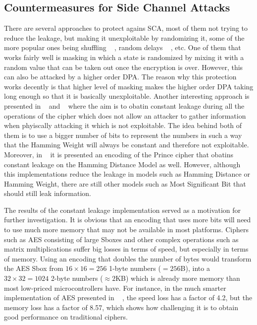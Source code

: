 \documentclass[conference]{IEEEtran}
\begin{document}
\subsection{Countermeasures for Side Channel Attacks}

There are several approaches to protect agains SCA, most of them not trying to reduce the leakage, but making it unexploitable by randomizing it, some of the more popular ones being shuffling ~\cite{WangShuffling} , random delays ~\cite{CoronRandomDelays} , etc. One of them that works fairly well is masking in which a state is randomized by mixing it with a random value that can be taken out once the encryption is over. However, this can also be attacked by a higher order DPA. The reason why this protection works decently is that higher level of masking makes the higher order DPA taking long enough so that it is basically unexploitable. Another interesting approach is presented in ~\cite{BEPrince} and ~\cite{ServantAES} where the aim is to obatin constant leakage during all the operations of the cipher which does not allow an attacker to gather information when phyiscally attacking it which is not exploitable. The idea behind both of them is to use a bigger number of bits to represent the numbers in such a way that the Hamming Weight will always be constant and therefore not exploitable. Moreover, in ~\cite{BEPrince} it is presented an encoding of the Prince cipher that obatins constant leakage on the Hamming Distance Model as well. However, although this implementations reduce the leakage in models such as Hamming Distance or Hamming Weight, there are still other models such as Most Significant Bit that should still leak information.

The results of the constant leakage implementation served as a motivation for further investigation. It is obvious that an encoding that uses more bits will need to use much more memory that may not be available in most platforms. Ciphers such as AES consisting of large Sboxes and other complex operations such as matrix multiplications suffer big losses in terms of speed, but especially in terms of memory. Using an encoding that doubles the number of bytes would transform the AES Sbox from $16 \times 16 = 256$ 1-byte numbers ($=256$B), into a $32 \times 32 = 1024$ 2-byte numbers ($\approx2$KB) which is already more memory than most low-priced microcontrollers have. For instance, in the much smarter implementation of AES presented in ~\cite{ServantAES} , the speed loss has a factor of 4.2, but the memory loss has a factor of 8.57, which shows how challenging it is to obtain good performance on traditional ciphers.
\end{document}
